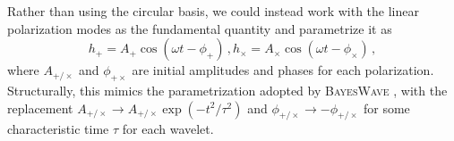 \documentclass[aps,prd,twocolumn,superscriptaddress,preprintnumbers,floatfix,nofootinbib]{revtex4-2}
\begin{document}
Rather than using the circular basis, we could instead work with the linear polarization modes as the fundamental quantity and parametrize it as
\begin{subequations} \label{eq:Aphi}
\begin{equation}
h_+ = A_+ \cos (\omega t - \phi_+)\, ,
\end{equation}
\begin{equation}
h_\times = A_\times \cos (\omega t - \phi_\times) \, ,
\end{equation}
\end{subequations}
where $A_{+/\times}$ and $\phi_{+\times}$ are initial amplitudes and phases for each polarization.
Structurally, this mimics the parametrization adopted by \textsc{BayesWave} \cite{Cornish:2020dwh}, with the replacement $A_{+/\times} \to A_{+/\times} \exp\left(-t^2/\tau^2\right)$ and $\phi_{+/\times} \to -\phi_{+/\times}$ for some characteristic time $\tau$ for each wavelet.

\newcommand{\xp}{x_{+}}
\newcommand{\xc}{x_{\times}}
\newcommand{\xpc}{x_{+/\times}}
\newcommand{\yp}{y_{+}}
\newcommand{\yc}{y_{\times}}
\newcommand{\ypc}{y_{+/\times}}

\end{document}
